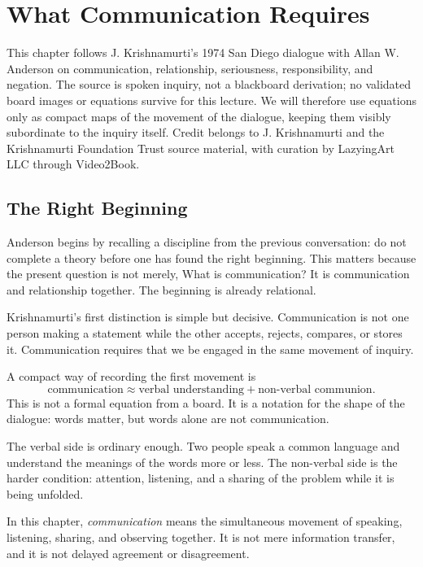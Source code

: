 \chapter{What Communication Requires}

This chapter follows J. Krishnamurti's 1974 San Diego dialogue with Allan W. Anderson on communication, relationship, seriousness, responsibility, and negation. The source is spoken inquiry, not a blackboard derivation; no validated board images or equations survive for this lecture. We will therefore use equations only as compact maps of the movement of the dialogue, keeping them visibly subordinate to the inquiry itself. Credit belongs to J. Krishnamurti and the Krishnamurti Foundation Trust source material, with curation by LazyingArt LLC through Video2Book.

\section{The Right Beginning}

Anderson begins by recalling a discipline from the previous conversation: do not complete a theory before one has found the right beginning. This matters because the present question is not merely, What is communication? It is communication and relationship together. The beginning is already relational.

Krishnamurti's first distinction is simple but decisive. Communication is not one person making a statement while the other accepts, rejects, compares, or stores it. Communication requires that we be engaged in the same movement of inquiry.

A compact way of recording the first movement is
\begin{equation}
\text{communication}
\approx
\text{verbal understanding}
+
\text{non-verbal communion}.
\end{equation}
This is not a formal equation from a board. It is a notation for the shape of the dialogue: words matter, but words alone are not communication.

The verbal side is ordinary enough. Two people speak a common language and understand the meanings of the words more or less. The non-verbal side is the harder condition: attention, listening, and a sharing of the problem while it is being unfolded.

\begin{definition}
In this chapter, \emph{communication} means the simultaneous movement of speaking, listening, sharing, and observing together. It is not mere information transfer, and it is not delayed agreement or disagreement.
\end{definition}

